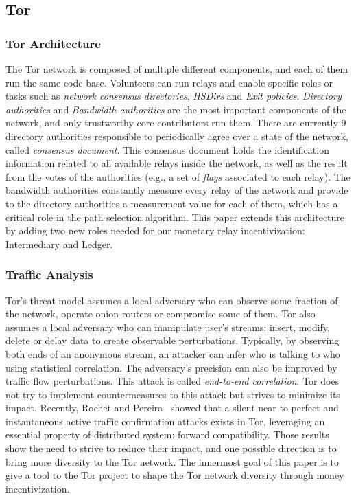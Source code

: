 \subsection{Tor}

\subsubsection{Tor Architecture}
The Tor network is composed of multiple different components, and each of them run the same code base. Volunteers can run relays and enable specific roles or tasks such as \textit{network consensus directories}, \textit{HSDirs} and \textit{Exit policies}. \textit{Directory authorities} and \textit{Bandwidth authorities} are the most important components of the network, and only trustworthy core contributors run them. There are currently 9 directory authorities responsible to periodically agree over a state of the network, called \textit{consensus document}. This consensus document holds the identification information related to all available relays inside the network, as well as the result from the votes of the authorities (e.g., a set of \textit{flags} associated to each relay). The bandwidth authorities constantly measure every relay of the network and provide to the directory authorities a measurement value for each of them, which has a critical role in the path selection algorithm. This paper extends this architecture by adding two new roles needed for our monetary relay incentivization: Intermediary and Ledger.
\subsubsection{Traffic Analysis}
Tor's threat model assumes a local adversary who can observe some fraction of the network, operate onion routers or compromise some of them. Tor also assumes a local adversary who can manipulate user's streams: insert, modify, delete or delay data to create observable perturbations. Typically, by observing both ends of an anonymous stream, an attacker can infer who is talking to who using statistical correlation. The adversary's precision can also be improved by traffic flow perturbations. This attack is called \textit{end-to-end correlation}. Tor does not try to implement countermeasures to this attack but strives to minimize its impact. Recently, Rochet and Pereira~\cite{popets-dropping} showed that a silent near to perfect and instantaneous active traffic confirmation attacks exists in Tor, leveraging an essential property of distributed system: forward compatibility. Those results show the need to strive to reduce their impact, and one possible direction is to bring more diversity to the Tor network. The innermost goal of this paper is to give a tool to the Tor project to shape the Tor network diversity through money incentivization.

